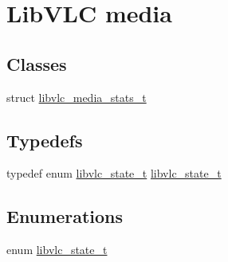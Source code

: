 \hypertarget{group__libvlc__media}{}\section{Lib\+V\+LC media}
\label{group__libvlc__media}
\subsection*{Classes}
\begin{DoxyCompactItemize}
\item 
struct \hyperlink{structlibvlc__media__stats__t}{libvlc\+\_\+media\+\_\+stats\+\_\+t}
\end{DoxyCompactItemize}
\subsection*{Typedefs}
\begin{DoxyCompactItemize}
\item 
typedef enum \hyperlink{group__libvlc__media_gac88ad60037ea05e1f23675a2ebe31efc}{libvlc\+\_\+state\+\_\+t} \hyperlink{group__libvlc__media_gaffb7eef042375f78ec9a6f1ae11ae0c3}{libvlc\+\_\+state\+\_\+t}
\end{DoxyCompactItemize}
\subsection*{Enumerations}
\begin{DoxyCompactItemize}
\item 
enum \hyperlink{group__libvlc__media_gac88ad60037ea05e1f23675a2ebe31efc}{libvlc\+\_\+state\+\_\+t} 
\end{DoxyCompactItemize}
